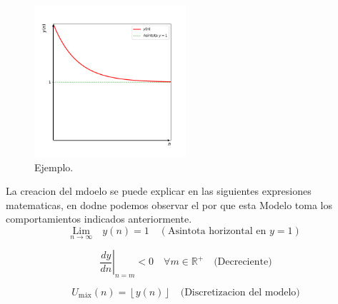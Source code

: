 \begin{figure}[h!]
    \centering
    \includegraphics[width=0.5\textwidth]{src/figures/Figure_1.png}
    \caption{Ejemplo.}
    \label{fig:jaccard}
\end{figure}



La creacion del mdoelo se puede explicar en las siguientes expresiones matematicas, en dodne podemos observar el por que esta Modelo toma los comportamientos indicados anteriormente.
\begin{equation}
    \underset{n \to \infty}{\text{Lim}} \quad y(n) = 1 \quad (\text{Asintota horizontal en } y=1)
\end{equation}

\begin{equation}
   \left. \frac{dy}{dn} \right|_{n = m} < 0 \quad \forall  m \in \mathbb{R}^+ \quad \text{(Decreciente)}
\end{equation}

\begin{equation}
  U_{\text{máx}}(n) = \left\lfloor y(n) \right\rfloor \quad \text{(Discretizacion del modelo)}
\end{equation}



